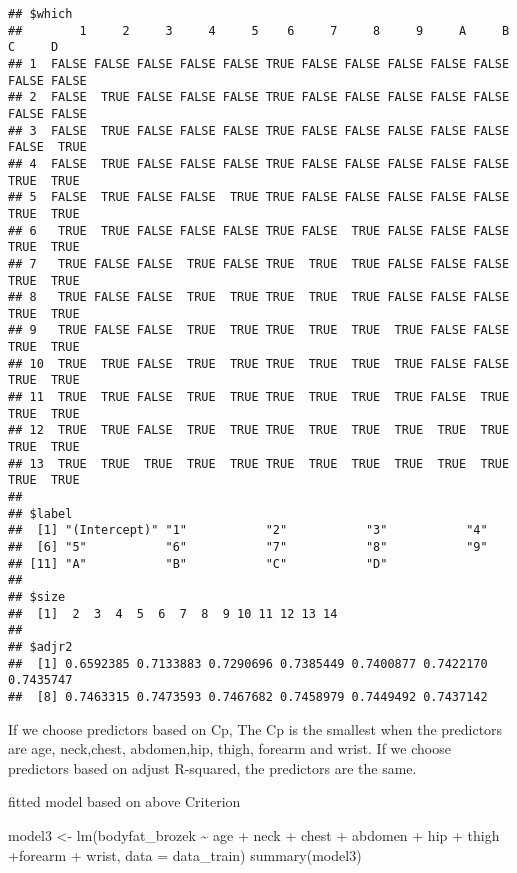 \documentclass[
]{article}
\newenvironment{Shaded}{\begin{snugshade}}{\end{snugshade}}
\newcommand{\AttributeTok}[1]{\textcolor[rgb]{0.77,0.63,0.00}{#1}}
\newcommand{\FunctionTok}[1]{\textcolor[rgb]{0.00,0.00,0.00}{#1}}
\newcommand{\NormalTok}[1]{#1}
\newcommand{\OtherTok}[1]{\textcolor[rgb]{0.56,0.35,0.01}{#1}}
\newcommand{\SpecialCharTok}[1]{\textcolor[rgb]{0.00,0.00,0.00}{#1}}
\begin{document}
\begin{verbatim}
## $which
##        1     2     3     4     5    6     7     8     9     A     B     C     D
## 1  FALSE FALSE FALSE FALSE FALSE TRUE FALSE FALSE FALSE FALSE FALSE FALSE FALSE
## 2  FALSE  TRUE FALSE FALSE FALSE TRUE FALSE FALSE FALSE FALSE FALSE FALSE FALSE
## 3  FALSE  TRUE FALSE FALSE FALSE TRUE FALSE FALSE FALSE FALSE FALSE FALSE  TRUE
## 4  FALSE  TRUE FALSE FALSE FALSE TRUE FALSE FALSE FALSE FALSE FALSE  TRUE  TRUE
## 5  FALSE  TRUE FALSE FALSE  TRUE TRUE FALSE FALSE FALSE FALSE FALSE  TRUE  TRUE
## 6   TRUE  TRUE FALSE FALSE FALSE TRUE FALSE  TRUE FALSE FALSE FALSE  TRUE  TRUE
## 7   TRUE FALSE FALSE  TRUE FALSE TRUE  TRUE  TRUE FALSE FALSE FALSE  TRUE  TRUE
## 8   TRUE FALSE FALSE  TRUE  TRUE TRUE  TRUE  TRUE FALSE FALSE FALSE  TRUE  TRUE
## 9   TRUE FALSE FALSE  TRUE  TRUE TRUE  TRUE  TRUE  TRUE FALSE FALSE  TRUE  TRUE
## 10  TRUE  TRUE FALSE  TRUE  TRUE TRUE  TRUE  TRUE  TRUE FALSE FALSE  TRUE  TRUE
## 11  TRUE  TRUE FALSE  TRUE  TRUE TRUE  TRUE  TRUE  TRUE FALSE  TRUE  TRUE  TRUE
## 12  TRUE  TRUE FALSE  TRUE  TRUE TRUE  TRUE  TRUE  TRUE  TRUE  TRUE  TRUE  TRUE
## 13  TRUE  TRUE  TRUE  TRUE  TRUE TRUE  TRUE  TRUE  TRUE  TRUE  TRUE  TRUE  TRUE
## 
## $label
##  [1] "(Intercept)" "1"           "2"           "3"           "4"          
##  [6] "5"           "6"           "7"           "8"           "9"          
## [11] "A"           "B"           "C"           "D"          
## 
## $size
##  [1]  2  3  4  5  6  7  8  9 10 11 12 13 14
## 
## $adjr2
##  [1] 0.6592385 0.7133883 0.7290696 0.7385449 0.7400877 0.7422170 0.7435747
##  [8] 0.7463315 0.7473593 0.7467682 0.7458979 0.7449492 0.7437142
\end{verbatim}

If we choose predictors based on Cp, The Cp is the smallest when the
predictors are age, neck,chest, abdomen,hip, thigh, forearm and wrist.
If we choose predictors based on adjust R-squared, the predictors are
the same.

fitted model based on above Criterion

\begin{Shaded}
\begin{Highlighting}[]
\NormalTok{model3 }\OtherTok{\textless{}{-}} \FunctionTok{lm}\NormalTok{(bodyfat\_brozek }\SpecialCharTok{\textasciitilde{}}\NormalTok{ age }\SpecialCharTok{+}\NormalTok{  neck }\SpecialCharTok{+}\NormalTok{ chest }\SpecialCharTok{+}\NormalTok{ abdomen }\SpecialCharTok{+}\NormalTok{ hip }\SpecialCharTok{+}\NormalTok{ thigh  }\SpecialCharTok{+}\NormalTok{forearm }\SpecialCharTok{+}\NormalTok{ wrist, }\AttributeTok{data =}\NormalTok{ data\_train)}
\FunctionTok{summary}\NormalTok{(model3)}
\end{Highlighting}
\end{Shaded}
\end{document}
